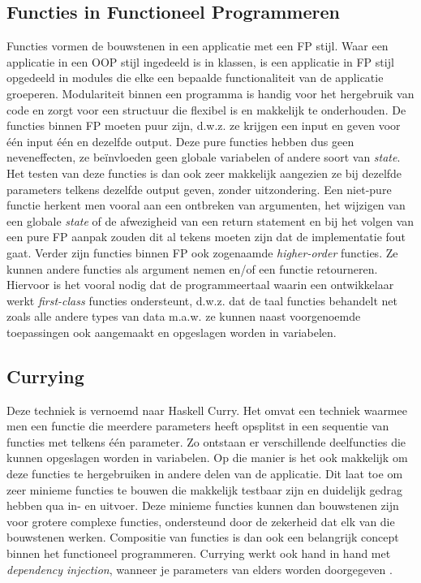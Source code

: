 \subsection{Functies in Functioneel Programmeren}
Functies vormen de bouwstenen in een applicatie met een FP stijl. Waar een applicatie in een OOP stijl ingedeeld is in klassen, is een applicatie in FP stijl opgedeeld in modules die elke een bepaalde functionaliteit van de applicatie groeperen. Modulariteit binnen een programma is handig voor het hergebruik van code en zorgt voor een structuur die flexibel is en makkelijk te onderhouden. 
De functies binnen FP moeten puur zijn, d.w.z. ze krijgen een input en geven voor één input één en dezelfde output. Deze pure functies hebben dus geen neveneffecten, ze beïnvloeden geen globale variabelen of andere soort van \textit{state}. Het testen van deze functies is dan ook zeer makkelijk aangezien ze bij dezelfde parameters telkens dezelfde output geven, zonder uitzondering. Een niet-pure functie herkent men vooral aan een ontbreken van argumenten, het wijzigen van een globale \textit{state} of de afwezigheid van een return statement en bij het volgen van een pure FP aanpak zouden dit al tekens moeten zijn dat de implementatie fout gaat.
Verder zijn functies binnen FP ook zogenaamde \textit{higher-order} functies. Ze kunnen andere functies als argument nemen en/of een functie retourneren. Hiervoor is het vooral nodig dat de programmeertaal waarin een ontwikkelaar werkt \textit{first-class} functies ondersteunt, d.w.z. dat de taal functies behandelt net zoals alle andere types van data m.a.w. ze kunnen naast voorgenoemde toepassingen ook aangemaakt en opgeslagen worden in variabelen.

\subsection{Currying}
Deze techniek is vernoemd naar Haskell Curry. Het omvat een techniek waarmee men een functie die meerdere parameters heeft opsplitst in een sequentie van functies met telkens één parameter. Zo ontstaan er verschillende deelfuncties die kunnen opgeslagen worden in variabelen. Op die manier is het ook makkelijk om deze functies te hergebruiken in andere delen van de applicatie. Dit laat toe om zeer minieme functies te bouwen die makkelijk testbaar zijn en duidelijk gedrag hebben qua in- en uitvoer. Deze minieme functies kunnen dan bouwstenen zijn voor grotere complexe functies, ondersteund door de zekerheid dat elk van die bouwstenen werken. Compositie van functies is dan ook een belangrijk concept binnen het functioneel programmeren. Currying werkt ook hand in hand met \textit{dependency injection}, wanneer je parameters van elders worden doorgegeven \autocite{Microsoft2019}.

